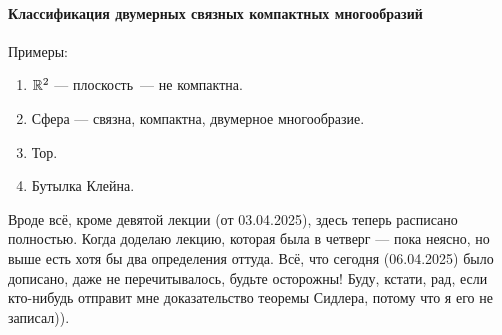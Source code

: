 \paragraph{Классификация двумерных связных компактных многообразий}
Примеры:
\begin{enumerate}
    \item $\mathbb{R}^2$ — плоскость — не компактна.
    \item Сфера — связна, компактна, двумерное многообразие.
    \item Тор.
    \item Бутылка Клейна.
\end{enumerate}


Вроде всё, кроме девятой лекции (от 03.04.2025), здесь теперь расписано полностью. Когда доделаю лекцию, которая была в четверг — пока неясно, но выше есть хотя бы два определения оттуда. Всё, что сегодня (06.04.2025) было дописано, даже не перечитывалось, будьте осторожны! Буду, кстати, рад, если кто-нибудь отправит мне доказательство теоремы Сидлера, потому что я его не записал)).